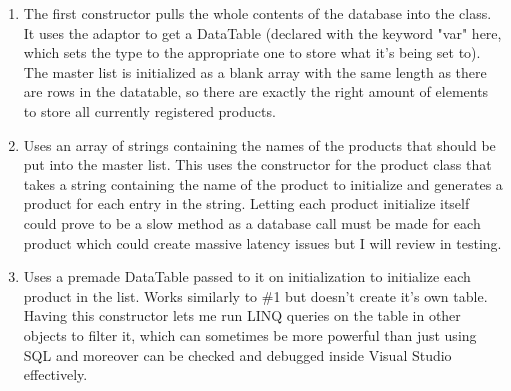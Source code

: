 ﻿\documentclass{article}
\begin{document}
    \begin{enumerate}
        \item The first constructor pulls the whole contents of the database into the class.
        It uses the adaptor to get a DataTable (declared with the keyword "var" here, which sets the type to the appropriate one to store what it's being set to).
        The master list is initialized as a blank array with the same length as there are rows in the datatable, so there are exactly the right amount of elements to store all currently registered products.
        \item Uses an array of strings containing the names of the products that should be put into the master list.
        This uses the constructor for the product class that takes a string containing the name of the product to initialize and generates a product for each entry in the string.
        Letting each product initialize itself could prove to be a slow method as a database call must be made for each product which could create massive latency issues but I will review in testing.
        \item Uses a premade DataTable passed to it on initialization to initialize each product in the list.
        Works similarly to \#1 but doesn't create it's own table.
        Having this constructor lets me run LINQ queries on the table in other objects to filter it, which can sometimes be more powerful than just using SQL and moreover can be checked and debugged inside Visual Studio effectively.
    \end{enumerate}
\end{document}
